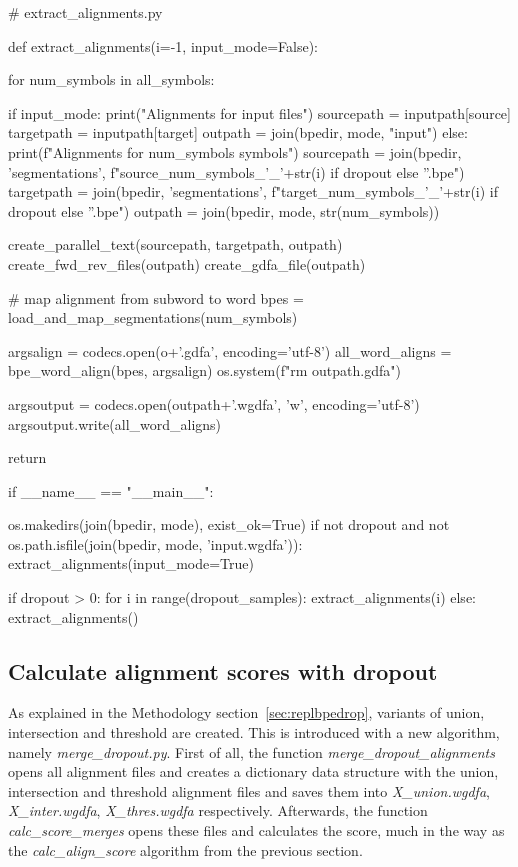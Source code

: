 \begin{python}
# extract_alignments.py

def extract_alignments(i=-1, input_mode=False):

  for num_symbols in all_symbols:

    if input_mode:
      print("Alignments for input files")
      sourcepath = inputpath[source]
      targetpath = inputpath[target]
      outpath = join(bpedir, mode, "input")
    else:
      print(f"Alignments for {num_symbols} symbols")
      sourcepath = join(bpedir, 'segmentations', f"{source}_{num_symbols}_{'_'+str(i) if dropout else ''}.bpe")
      targetpath = join(bpedir, 'segmentations', f"{target}_{num_symbols}_{'_'+str(i) if dropout else ''}.bpe")
      outpath = join(bpedir, mode, str(num_symbols))

    create_parallel_text(sourcepath, targetpath, outpath)
    create_fwd_rev_files(outpath)
    create_gdfa_file(outpath)

    # map alignment from subword to word
    bpes = load_and_map_segmentations(num_symbols)

    argsalign = codecs.open(o+'.gdfa', encoding='utf-8')
    all_word_aligns = bpe_word_align(bpes, argsalign)
    os.system(f"rm {outpath}.gdfa")

    argsoutput = codecs.open(outpath+'.wgdfa', 'w', encoding='utf-8')
    argsoutput.write(all_word_aligns)

  return

if __name__ == "__main__":

  os.makedirs(join(bpedir, mode), exist_ok=True)
  if not dropout and not os.path.isfile(join(bpedir, mode, 'input.wgdfa')):
    extract_alignments(input_mode=True)

  if dropout > 0:
    for i in range(dropout_samples):
      extract_alignments(i)
  else:
    extract_alignments()
\end{python}

\subsection{Calculate alignment scores with dropout}

As explained in the Methodology section~\ref{sec:replbpedrop}, variants of union, intersection and threshold are created. This is introduced with a new algorithm, namely \emph{merge\_dropout.py}. First of all, the function \emph{merge\_dropout\_alignments} opens all alignment files and creates a dictionary data structure with the union, intersection and threshold alignment files and saves them into \emph{X\_union.wgdfa}, \emph{X\_inter.wgdfa}, \emph{X\_thres.wgdfa} respectively. Afterwards, the function \emph{calc\_score\_merges} opens these files and calculates the score, much in the way as the \emph{calc\_align\_score} algorithm from the previous section.

